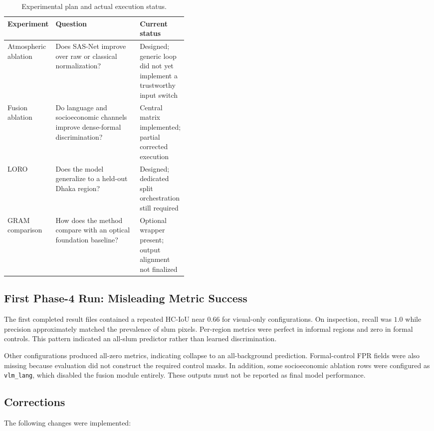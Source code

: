 \documentclass[11pt,a4paper]{article}
\begin{document}
\begin{table}[H]
\centering
\caption{Experimental plan and actual execution status.}
\begin{tabularx}{\linewidth}{p{0.18\linewidth}Yp{0.24\linewidth}}
\toprule
\textbf{Experiment} & \textbf{Question} & \textbf{Current status}\\
\midrule
Atmospheric ablation & Does SAS-Net improve over raw or classical normalization? & Designed; generic loop did not yet implement a trustworthy input switch\\
Fusion ablation & Do language and socioeconomic channels improve dense-formal discrimination? & Central matrix implemented; partial corrected execution\\
LORO & Does the model generalize to a held-out Dhaka region? & Designed; dedicated split orchestration still required\\
GRAM comparison & How does the method compare with an optical foundation baseline? & Optional wrapper present; output alignment not finalized\\
\bottomrule
\end{tabularx}
\end{table}

\subsection{First Phase-4 Run: Misleading Metric Success}

The first completed result files contained a repeated HC-IoU near \(0.66\) for visual-only configurations. On inspection, recall was \(1.0\) while precision approximately matched the prevalence of slum pixels. Per-region metrics were perfect in informal regions and zero in formal controls. This pattern indicated an all-slum predictor rather than learned discrimination.

Other configurations produced all-zero metrics, indicating collapse to an all-background prediction. Formal-control FPR fields were also missing because evaluation did not construct the required control masks. In addition, some socioeconomic ablation rows were configured as \texttt{vlm\_lang}, which disabled the fusion module entirely. These outputs must not be reported as final model performance.

\subsection{Corrections}

The following changes were implemented:
\end{document}
